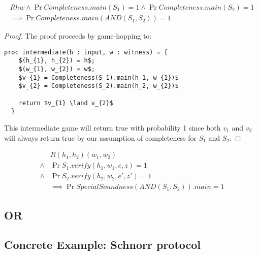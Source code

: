 \begin{lemma}
  \begin{align*}
    R h w \land
    \Pr{Completeness.main(S_{1})} = 1 \land \Pr{Completeness.main(S_{2})} = 1 \\
    \implies \Pr{Completeness.main(AND(S_{1}, S_{2}))} = 1
  \end{align*}
\end{lemma}
\begin{proof}
  The proof proceeds by game-hopping to:
  \begin{lstlisting}[mathescape]
  proc intermediate(h : input, w : witness) = {
    $(h_{1}, h_{2}) = h$;
    $(w_{1}, w_{2}) = w$;
    $v_{1} = Completeness(S_1).main(h_1, w_{1})$
    $v_{2} = Completeness(S_2).main(h_2, w_{2})$

    return $v_{1} \land v_{2}$
  }
  \end{lstlisting}

  This intermediate game will return true with probability 1 since both
  $v_{1}$ and $v_{2}$ will always return true by our assumption of completeness
  for $S_{1}$ and $S_{2}$.
\end{proof}

\begin{lemma}
  \begin{align*}
    &R (h_{1}, h_{2}) (w_{1}, w_{2}) \\
    \land &\Pr{S_{1}.verify(h_{1}, w_{1}, e, z)} = 1 \\
    \land &\Pr{S_{2}.verify(h_{2}, w_{2}, e', z')} = 1 \\
    &\implies \Pr{SpecialSoundness(AND(S_{1}, S_{2})).main} = 1
  \end{align*}
\end{lemma}



\subsection{OR}
\label{subsec:sigma_OR}


\subsection{Concrete Example: Schnorr protocol}
\label{subsec:schnorr}




